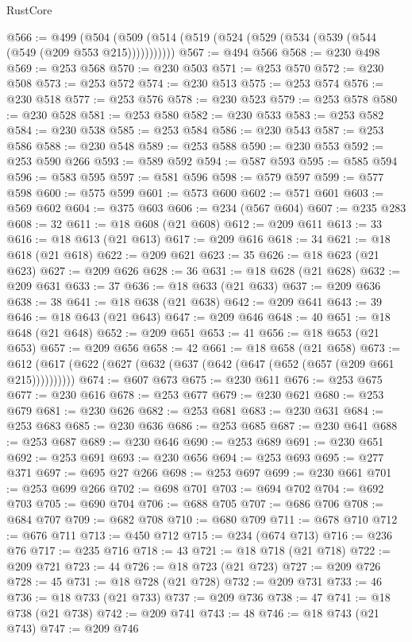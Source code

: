 \begin{lexlean}{RustCore}
\begin{coremodule}
@566 := @499 (@504 (@509 (@514 (@519 (@524 (@529 (@534 (@539 (@544 (@549 (@209 @553 @215)))))))))))
@567 := @494 @566
@568 := @230 @498
@569 := @253 @568
@570 := @230 @503
@571 := @253 @570
@572 := @230 @508
@573 := @253 @572
@574 := @230 @513
@575 := @253 @574
@576 := @230 @518
@577 := @253 @576
@578 := @230 @523
@579 := @253 @578
@580 := @230 @528
@581 := @253 @580
@582 := @230 @533
@583 := @253 @582
@584 := @230 @538
@585 := @253 @584
@586 := @230 @543
@587 := @253 @586
@588 := @230 @548
@589 := @253 @588
@590 := @230 @553
@592 := @253 @590 @266
@593 := @589 @592
@594 := @587 @593
@595 := @585 @594
@596 := @583 @595
@597 := @581 @596
@598 := @579 @597
@599 := @577 @598
@600 := @575 @599
@601 := @573 @600
@602 := @571 @601
@603 := @569 @602
@604 := @375 @603
@606 := @234 (@567 @604)
@607 := @235 @283
@608 := 32
@611 := @18 @608 (@21 @608)
@612 := @209 @611
@613 := 33
@616 := @18 @613 (@21 @613)
@617 := @209 @616
@618 := 34
@621 := @18 @618 (@21 @618)
@622 := @209 @621
@623 := 35
@626 := @18 @623 (@21 @623)
@627 := @209 @626
@628 := 36
@631 := @18 @628 (@21 @628)
@632 := @209 @631
@633 := 37
@636 := @18 @633 (@21 @633)
@637 := @209 @636
@638 := 38
@641 := @18 @638 (@21 @638)
@642 := @209 @641
@643 := 39
@646 := @18 @643 (@21 @643)
@647 := @209 @646
@648 := 40
@651 := @18 @648 (@21 @648)
@652 := @209 @651
@653 := 41
@656 := @18 @653 (@21 @653)
@657 := @209 @656
@658 := 42
@661 := @18 @658 (@21 @658)
@673 := @612 (@617 (@622 (@627 (@632 (@637 (@642 (@647 (@652 (@657 (@209 @661 @215))))))))))
@674 := @607 @673
@675 := @230 @611
@676 := @253 @675
@677 := @230 @616
@678 := @253 @677
@679 := @230 @621
@680 := @253 @679
@681 := @230 @626
@682 := @253 @681
@683 := @230 @631
@684 := @253 @683
@685 := @230 @636
@686 := @253 @685
@687 := @230 @641
@688 := @253 @687
@689 := @230 @646
@690 := @253 @689
@691 := @230 @651
@692 := @253 @691
@693 := @230 @656
@694 := @253 @693
@695 := @277 @371
@697 := @695 @27 @266
@698 := @253 @697
@699 := @230 @661
@701 := @253 @699 @266
@702 := @698 @701
@703 := @694 @702
@704 := @692 @703
@705 := @690 @704
@706 := @688 @705
@707 := @686 @706
@708 := @684 @707
@709 := @682 @708
@710 := @680 @709
@711 := @678 @710
@712 := @676 @711
@713 := @450 @712
@715 := @234 (@674 @713)
@716 := @236 @76
@717 := @235 @716
@718 := 43
@721 := @18 @718 (@21 @718)
@722 := @209 @721
@723 := 44
@726 := @18 @723 (@21 @723)
@727 := @209 @726
@728 := 45
@731 := @18 @728 (@21 @728)
@732 := @209 @731
@733 := 46
@736 := @18 @733 (@21 @733)
@737 := @209 @736
@738 := 47
@741 := @18 @738 (@21 @738)
@742 := @209 @741
@743 := 48
@746 := @18 @743 (@21 @743)
@747 := @209 @746

\end{coremodule}
\end{lexlean}
